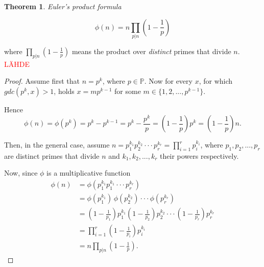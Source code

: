 \documentclass{article}
\theoremstyle{definition}
\newtheorem{theorem}[subsubsection]{Theorem}
\begin{document}
\begin{theorem}{\emph{Euler's product formula}}
\label{thm:product}

\begin{equation*}
    \phi(n) = n \prod_{p \vert n} \left(1 - \frac{1}{p}\right)
\end{equation*}

where $\prod_{p \vert n} \left(1 - \frac{1}{p}\right)$ means the product over \emph{distinct} primes that divide $n$.
\textcolor{red}{LÄHDE}

\begin{proof}

Assume first that $n = p^k$, where $p\in \mathbb{P}$. Now for every $x$, for which $gdc(p^k,x)>1$, holds $x=mp^{k-1}$ for some $m\in \{1,2,...,p^{k-1}\}$.

Hence
\begin{equation*}
    \phi(n)=\phi(p^k)=p^k-p^{k-1}=p^k-\frac{p^k}{p}=\left(1-\frac{1}{p}\right)p^k=\left(1-\frac{1}{p}\right)n.
\end{equation*}

Then, in the general case, assume $n=p_1^{k_1} p_2^{k_2} \cdot \cdot \cdot p_r^{k_r}=\prod_{i=1}^r p_i^{k_i}$, where $p_1,p_2,...,p_r$ are distinct primes that divide $n$ and $k_1,k_2,...,k_r$ their powers respectively. 


Now, since $\phi$ is a multiplicative function
\begin{align*}
    \phi(n) & = \phi(p_1^{k_1} p_1^{k_1} \cdot \cdot \cdot p_r^{k_r})\\
    & = \phi(p_1^{k_1})\,\phi(p_2^{k_2}) \cdot \cdot \cdot \phi(p_r^{k_r})\\
    & = \left(1-\frac{1}{p_1}\right)p_1^{k_1} \left(1-\frac{1}{p_2}\right)p_2^{k_2} \cdot \cdot \cdot \left(1-\frac{1}{p_r}\right)p_r^{k_r}\\
    & = \prod_{i=1}^r \left(1-\frac{1}{p_i}\right) p_i^{k_i}\\
    & = n \prod_{p \vert n} \left(1 - \frac{1}{p}\right).
\end{align*}

\end{proof}

\end{theorem}
\end{document}
